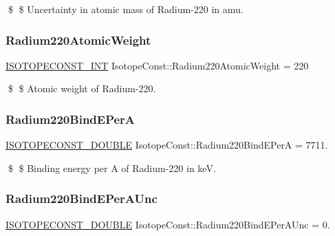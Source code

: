 \$ \$ Uncertainty in atomic mass of Radium-\/220 in amu. \mbox{\label{group___isotope_const-_radium-_ra220_ga596f48ee5baf29a7ec5c5016b96a146e}} 
\subsubsection{\texorpdfstring{Radium220\+Atomic\+Weight}{Radium220AtomicWeight}}
{\footnotesize\ttfamily \mbox{\hyperlink{group___isotope_const-_macros_ga5f18360b3e99483a35c32d789e62621c}{I\+S\+O\+T\+O\+P\+E\+C\+O\+N\+S\+T\+\_\+\+I\+NT}} Isotope\+Const\+::\+Radium220\+Atomic\+Weight = 220}

\$ \$ Atomic weight of Radium-\/220. \mbox{\label{group___isotope_const-_radium-_ra220_ga4a301426eb805701d13fe1546452b263}} 
\subsubsection{\texorpdfstring{Radium220\+Bind\+E\+PerA}{Radium220BindEPerA}}
{\footnotesize\ttfamily \mbox{\hyperlink{group___isotope_const-_macros_ga8f45a7272ce02c0b4c65c44636ed719a}{I\+S\+O\+T\+O\+P\+E\+C\+O\+N\+S\+T\+\_\+\+D\+O\+U\+B\+LE}} Isotope\+Const\+::\+Radium220\+Bind\+E\+PerA = 7711.}

\$ \$ Binding energy per A of Radium-\/220 in keV. \mbox{\label{group___isotope_const-_radium-_ra220_gada88eeef8b62904615ffc02dd121cf28}} 
\subsubsection{\texorpdfstring{Radium220\+Bind\+E\+Per\+A\+Unc}{Radium220BindEPerAUnc}}
{\footnotesize\ttfamily \mbox{\hyperlink{group___isotope_const-_macros_ga8f45a7272ce02c0b4c65c44636ed719a}{I\+S\+O\+T\+O\+P\+E\+C\+O\+N\+S\+T\+\_\+\+D\+O\+U\+B\+LE}} Isotope\+Const\+::\+Radium220\+Bind\+E\+Per\+A\+Unc = 0.}

